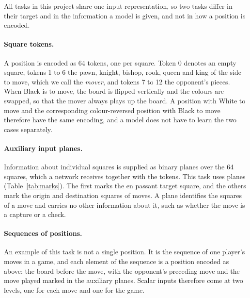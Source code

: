 All tasks in this project share one input representation, so two tasks differ
in their target and in the information a model is given, and not in how a
position is encoded.

\paragraph{Square tokens.}
A position is encoded as 64 tokens, one per square. Token 0 denotes an empty
square, tokens 1 to 6 the pawn, knight, bishop, rook, queen and king of the
side to move, which we call the \emph{mover}, and tokens 7 to 12 the
opponent's pieces. When Black is to move, the board is flipped vertically and
the colours are swapped, so that the mover always plays up the board. A
position with White to move and the corresponding colour-reversed position
with Black to move therefore have the same encoding, and a model does not
have to learn the two cases separately.

\paragraph{Auxiliary input planes.}
Information about individual squares is supplied as binary planes over the 64
squares, which a network receives together with the tokens. This task uses
 planes (Table~\ref{tab:marks}). The first marks the en
passant target square, and the others mark the origin and destination squares
of moves. A plane identifies the squares of a move and carries no other
information about it, such as whether the move is a capture or a check.

\begin{table}[htbp]\centering\small
{}
\caption{Auxiliary input planes. Squares are given from the mover's point of
view, after the board has been flipped.}
\label{tab:marks}
\end{table}

\ifsequence
\paragraph{Sequences of positions.}
An example of this task is not a single position. It is the sequence of one
player's moves in a game, and each element of the sequence is a position
encoded as above: the board before the move, with the opponent's preceding
move and the move played marked in the auxiliary planes. Scalar inputs
therefore come at two levels, one for each move and one for the game.

